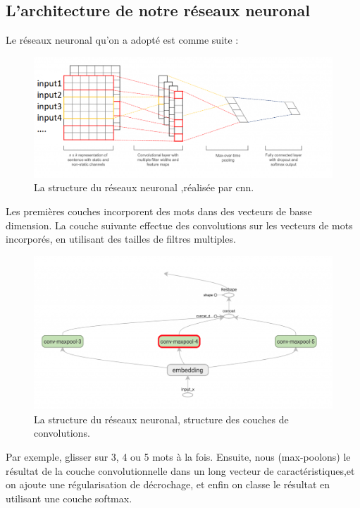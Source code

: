 \subsection{L'architecture de notre réseaux neuronal}
Le réseaux neuronal qu'on a adopté est comme suite : 

\begin{figure}[H]
	\begin{center}
	\includegraphics[width=\linewidth]{Images/cnn.png}
	\end{center}
	\caption{La structure du réseaux neuronal ,réalisée par cnn.}
	\label{fig:cnn1}
\end{figure}

Les premières couches incorporent des mots dans des vecteurs de basse dimension. La couche suivante effectue des convolutions sur les vecteurs de mots incorporés, en utilisant des tailles de filtres multiples.\\[0.2cm]

\begin{figure}[H]
	\begin{center}
	\includegraphics[width=\linewidth]{Images/cnn1.png}
	\end{center}
	\caption{La structure du réseaux neuronal, structure des couches de convolutions.}
	\label{fig:cnn1}
\end{figure}
 Par exemple, glisser sur 3, 4 ou 5 mots à la fois. Ensuite, nous (max-poolons) le résultat de la couche convolutionnelle dans un long vecteur de caractéristiques,et on ajoute une régularisation de décrochage, et enfin on  classe le résultat en utilisant une couche softmax.\\[0.5cm]
 
